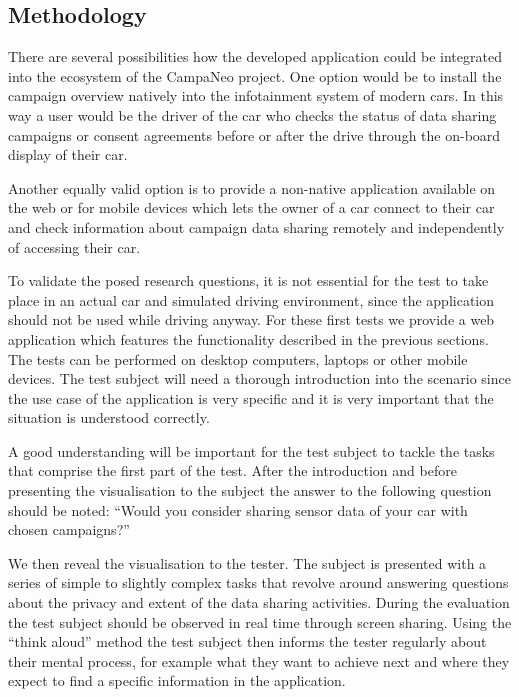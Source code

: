\documentclass[../paper.tex]{subfiles}
\begin{document}

  \subsection{Methodology}

  There are several possibilities how the developed application could be
  integrated into the ecosystem of the CampaNeo project.
  One option would be to install the campaign overview natively into the
  infotainment system of modern cars. In this way a user would be the driver
  of the car who checks the status of data sharing campaigns or consent
  agreements before or after the drive through the on-board display of their car.

  Another equally valid option is to provide a non-native application available
  on the web or for mobile devices which lets the owner of a car connect to
  their car and check information about campaign data sharing remotely and
  independently of accessing their car.

  To validate the posed research questions, it is not essential for the test to
  take place in an actual car and simulated driving environment, since the
  application should not be used while driving anyway. For these first tests we
  provide a web application which features the functionality described in the
  previous sections. The tests can be performed on desktop computers, laptops
  or other mobile devices. The test subject will need a thorough introduction
  into the scenario since the use case of the application is very specific and
  it is very important that the situation is understood correctly.

  A good understanding will be important for the test subject to tackle the
  tasks that comprise the first part of the test. After the introduction and
  before presenting the visualisation to the subject the answer to the
  following question should be noted: “Would you consider sharing sensor data
  of your car with chosen campaigns?”

  We then reveal the visualisation to the tester. The subject is presented with
  a series of simple to slightly complex tasks that revolve around answering
  questions about the privacy and extent of the data sharing activities.
  During the evaluation the test subject should be observed in real time
  through screen sharing. Using the “think aloud” method the test subject then
  informs the tester regularly about their mental process, for example what
  they want to achieve next and where they expect to find a specific information
  in the application.
\end{document}
